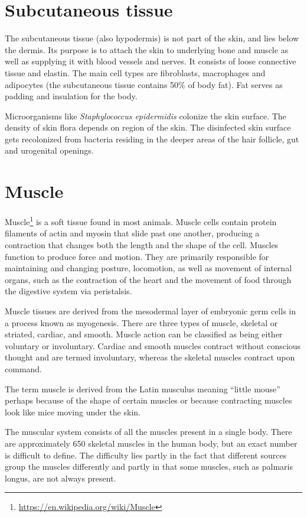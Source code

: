 \documentclass[]{book}
\let\rmarkdownfootnote\footnote%
\def\footnote{\protect\rmarkdownfootnote}
\renewcommand{\href}[2]{#2\footnote{\url{#1}}}
\theoremstyle{definition}
\theoremstyle{definition}
\theoremstyle{definition}
\theoremstyle{remark}
\begin{document}
\section{Subcutaneous tissue}\label{subcutaneous-tissue}

The subcutaneous tissue (also hypodermis) is not part of the skin, and
lies below the dermis. Its purpose is to attach the skin to underlying
bone and muscle as well as supplying it with blood vessels and nerves.
It consists of loose connective tissue and elastin. The main cell types
are fibroblasts, macrophages and adipocytes (the subcutaneous tissue
contains 50\% of body fat). Fat serves as padding and insulation for the
body.

Microorganisms like \emph{Staphylococcus epidermidis} colonize the skin
surface. The density of skin flora depends on region of the skin. The
disinfected skin surface gets recolonized from bacteria residing in the
deeper areas of the hair follicle, gut and urogenital openings.

\section{Muscle}\label{muscle}

\href{https://en.wikipedia.org/wiki/Muscle}{Muscle} is a soft tissue
found in most animals. Muscle cells contain protein filaments of actin
and myosin that slide past one another, producing a contraction that
changes both the length and the shape of the cell. Muscles function to
produce force and motion. They are primarily responsible for maintaining
and changing posture, locomotion, as well as movement of internal
organs, such as the contraction of the heart and the movement of food
through the digestive system via peristalsis.

Muscle tissues are derived from the mesodermal layer of embryonic germ
cells in a process known as myogenesis. There are three types of muscle,
skeletal or striated, cardiac, and smooth. Muscle action can be
classified as being either voluntary or involuntary. Cardiac and smooth
muscles contract without conscious thought and are termed involuntary,
whereas the skeletal muscles contract upon command.

The term muscle is derived from the Latin musculus meaning ``little
mouse'' perhaps because of the shape of certain muscles or because
contracting muscles look like mice moving under the skin.

The muscular system consists of all the muscles present in a single
body. There are approximately 650 skeletal muscles in the human body,
but an exact number is difficult to define. The difficulty lies partly
in the fact that different sources group the muscles differently and
partly in that some muscles, such as palmaris longus, are not always
present.
\end{document}
